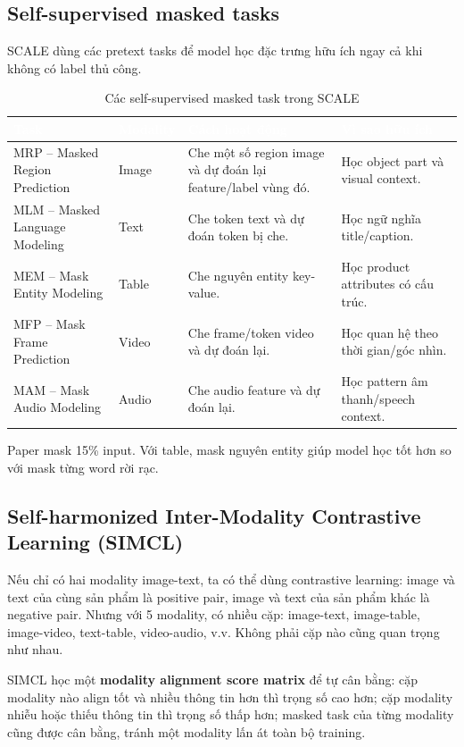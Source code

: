 \documentclass[12pt,a4paper]{article}
\begin{document}
\subsection{Self-supervised masked tasks}
SCALE dùng các pretext tasks để model học đặc trưng hữu ích ngay cả khi không có label thủ công.

\begin{table}[htbp]
\centering
\begin{tabularx}{\linewidth}{@{}L{2.6cm}C{1.7cm}Y Y@{}}
\toprule
{}
\textcolor{white}{\textbf{Task}} & \textcolor{white}{\textbf{Modality}} & \textcolor{white}{\textbf{Cách hoạt động}} & \textcolor{white}{\textbf{Vì sao hữu ích}} \\
\midrule
MRP -- Masked Region Prediction & Image & Che một số region image và dự đoán lại feature/label vùng đó. & Học object part và visual context. \\
MLM -- Masked Language Modeling & Text & Che token text và dự đoán token bị che. & Học ngữ nghĩa title/caption. \\
MEM -- Mask Entity Modeling & Table & Che nguyên entity key-value. & Học product attributes có cấu trúc. \\
MFP -- Mask Frame Prediction & Video & Che frame/token video và dự đoán lại. & Học quan hệ theo thời gian/góc nhìn. \\
MAM -- Mask Audio Modeling & Audio & Che audio feature và dự đoán lại. & Học pattern âm thanh/speech context. \\
\bottomrule
\end{tabularx}
\caption{Các self-supervised masked task trong SCALE}
\end{table}

Paper mask 15\% input. Với table, mask nguyên entity giúp model học tốt hơn so với mask từng word rời rạc.

\subsection{Self-harmonized Inter-Modality Contrastive Learning (SIMCL)}
Nếu chỉ có hai modality image-text, ta có thể dùng contrastive learning: image và text của cùng sản phẩm là positive pair, image và text của sản phẩm khác là negative pair. Nhưng với 5 modality, có nhiều cặp: image-text, image-table, image-video, text-table, video-audio, v.v. Không phải cặp nào cũng quan trọng như nhau.

SIMCL học một \textbf{modality alignment score matrix} để tự cân bằng: cặp modality nào align tốt và nhiều thông tin hơn thì trọng số cao hơn; cặp modality nhiễu hoặc thiếu thông tin thì trọng số thấp hơn; masked task của từng modality cũng được cân bằng, tránh một modality lấn át toàn bộ training.
\end{document}
